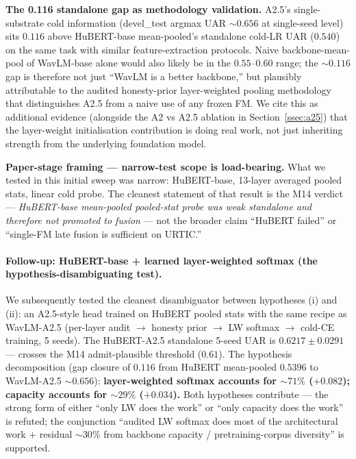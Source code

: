 \textbf{The 0.116 standalone gap as methodology validation.} A2.5's single-substrate cold information (devel\_test argmax UAR $\sim 0.656$ at single-seed level) sits $0.116$ above HuBERT-base mean-pooled's standalone cold-LR UAR ($0.540$) on the same task with similar feature-extraction protocols. Naive backbone-mean-pool of WavLM-base alone would also likely be in the $0.55$--$0.60$ range; the $\sim 0.116$ gap is therefore not just ``WavLM is a better backbone,'' but plausibly attributable to the audited honesty-prior layer-weighted pooling methodology that distinguishes A2.5 from a naive use of any frozen FM. We cite this as additional evidence (alongside the A2 vs A2.5 ablation in Section~\ref{ssec:a25}) that the layer-weight initialisation contribution is doing real work, not just inheriting strength from the underlying foundation model.

\textbf{Paper-stage framing --- narrow-test scope is load-bearing.} What we tested in this initial sweep was narrow: HuBERT-base, 13-layer averaged pooled stats, linear cold probe. The cleanest statement of that result is the M14 verdict --- \emph{HuBERT-base mean-pooled pooled-stat probe was weak standalone and therefore not promoted to fusion} --- not the broader claim ``HuBERT failed'' or ``single-FM late fusion is sufficient on URTIC.''

\paragraph{Follow-up: HuBERT-base + learned layer-weighted softmax (the hypothesis-disambiguating test).} We subsequently tested the cleanest disambiguator between hypotheses (i) and (ii): an A2.5-style head trained on HuBERT pooled stats with the same recipe as WavLM-A2.5 (per-layer audit $\to$ honesty prior $\to$ LW softmax $\to$ cold-CE training, 5 seeds). The HuBERT-A2.5 standalone 5-seed UAR is $\mathbf{0.6217 \pm 0.0291}$ --- crosses the M14 admit-plausible threshold ($0.61$). The hypothesis decomposition (gap closure of $0.116$ from HuBERT mean-pooled $0.5396$ to WavLM-A2.5 $\sim 0.656$): \textbf{layer-weighted softmax accounts for $\sim 71\%$ ($+0.082$); capacity accounts for $\sim 29\%$ ($+0.034$).} Both hypotheses contribute --- the strong form of either ``only LW does the work'' or ``only capacity does the work'' is refuted; the conjunction ``audited LW softmax does most of the architectural work + residual ${\sim}30\%$ from backbone capacity / pretraining-corpus diversity'' is supported.

